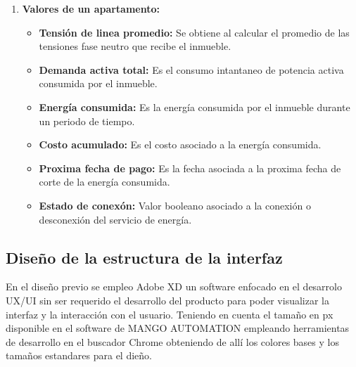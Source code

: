\begin{enumerate}
        \item \textbf{Valores de un apartamento:}
        
        \begin{itemize}
            \item \textbf{Tensión de linea promedio:} Se obtiene al calcular el promedio de las tensiones fase neutro que recibe el inmueble.
            \item \textbf{Demanda activa total:} Es el consumo intantaneo de potencia activa consumida por el inmueble.
            \item \textbf{Energía consumida:} Es la energía consumida por el inmueble durante un periodo de tiempo.
            \item \textbf{Costo acumulado:} Es el costo asociado a la energía consumida.
            \item \textbf{Proxima fecha de pago:} Es la fecha asociada a la proxima fecha de corte de la energía consumida.
            \item \textbf{Estado de conexón:} Valor booleano asociado a la conexión o desconexión del servicio de energía.
        \end{itemize}
    \end{enumerate}
\subsection{Diseño de la estructura de la interfaz}

    En el diseño previo se empleo Adobe XD un software enfocado en el desarrolo UX/UI sin ser requerido el desarrollo del producto para
    poder visualizar la interfaz y la interacción con el usuario. Teniendo en cuenta el tamaño en px disponible en el software de MANGO AUTOMATION
    empleando herramientas de desarrollo en el buscador Chrome obteniendo de allí los colores bases y los tamaños estandares para el dieño.\\

